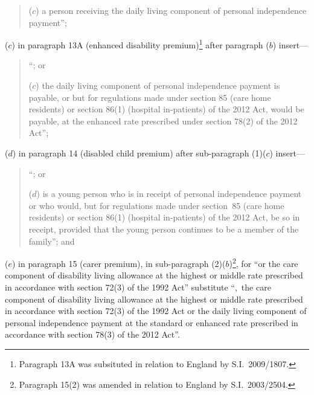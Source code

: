 \documentclass[12pt,a4paper]{article}
\begin{document}
\begin{enumerate}
\begin{enumerate}
\begin{quotation}
($c$) a person receiving the daily living component of personal independence payment”;
\end{quotation}
\end{enumerate}

($c$) in paragraph 13A (enhanced disability premium)\footnote{Paragraph 13A was subsituted in relation to England by S.I.~2009/1807.} after paragraph ($b$)  insert—
\begin{quotation}
“; or

($c$) the daily living component of personal independence payment is payable, or but for regulations made under section 85 (care home residents) or section 86(1) (hospital in-patients) of the 2012 Act, would be payable, at the enhanced rate prescribed under section 78(2) of the 2012 Act”;
\end{quotation}

($d$) in paragraph 14 (disabled child premium) after sub-paragraph (1)($c$)  insert—
\begin{quotation}
“; or

($d$) is a young person who is in receipt of personal independence payment or who would, but for regulations made under section~85 (care home residents) or section 86(1) (hospital in-patients) of the 2012 Act, be so in receipt, provided that the young person continues to be a member of the family”; and
\end{quotation}

($e$) in paragraph 15 (carer premium), in sub-paragraph (2)($b$)\footnote{Paragraph 15(2) was amended in relation to England by S.I.~2003/2504.}, for “or the care component of disability living allowance at the highest or middle rate prescribed in accordance with section 72(3) of the 1992 Act” substitute “,~the care component of disability living allowance at the highest or middle rate prescribed in accordance with section 72(3) of the 1992 Act or the daily living component of personal independence payment at the standard or enhanced rate prescribed in accordance with section 78(3) of the 2012 Act”.
\end{enumerate}
\end{document}
